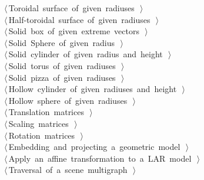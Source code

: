 \documentclass[11pt,oneside]{article}	%
\begin{document}
\begin{flushleft}
\begin{list}{}{}
\mbox{}\verb@@\hbox{$\langle\,$Toroidal surface of given radiuses\nobreak\ {\footnotesize {}}$\,\rangle$}\verb@@\\
\mbox{}\verb@@\hbox{$\langle\,$Half-toroidal surface of given radiuses\nobreak\ {\footnotesize {}}$\,\rangle$}\verb@@\\
\mbox{}\verb@@\hbox{$\langle\,$Solid box of given extreme vectors\nobreak\ {\footnotesize {}}$\,\rangle$}\verb@@\\
\mbox{}\verb@@\hbox{$\langle\,$Solid Sphere of given radius\nobreak\ {\footnotesize {}}$\,\rangle$}\verb@@\\
\mbox{}\verb@@\hbox{$\langle\,$Solid cylinder of given radius and height\nobreak\ {\footnotesize {}}$\,\rangle$}\verb@@\\
\mbox{}\verb@@\hbox{$\langle\,$Solid torus of given radiuses\nobreak\ {\footnotesize {}}$\,\rangle$}\verb@@\\
\mbox{}\verb@@\hbox{$\langle\,$Solid pizza of given radiuses\nobreak\ {\footnotesize {}}$\,\rangle$}\verb@@\\
\mbox{}\verb@@\hbox{$\langle\,$Hollow cylinder of given radiuses and height\nobreak\ {\footnotesize {}}$\,\rangle$}\verb@@\\
\mbox{}\verb@@\hbox{$\langle\,$Hollow sphere of given radiuses\nobreak\ {\footnotesize {}}$\,\rangle$}\verb@@\\
\mbox{}\verb@@\hbox{$\langle\,$Translation matrices\nobreak\ {\footnotesize {}}$\,\rangle$}\verb@@\\
\mbox{}\verb@@\hbox{$\langle\,$Scaling matrices\nobreak\ {\footnotesize {}}$\,\rangle$}\verb@@\\
\mbox{}\verb@@\hbox{$\langle\,$Rotation matrices\nobreak\ {\footnotesize {}}$\,\rangle$}\verb@@\\
\mbox{}\verb@@\hbox{$\langle\,$Embedding and projecting a geometric model\nobreak\ {\footnotesize {}}$\,\rangle$}\verb@@\\
\mbox{}\verb@@\hbox{$\langle\,$Apply an affine transformation to a LAR model\nobreak\ {\footnotesize {}}$\,\rangle$}\verb@@\\
\mbox{}\verb@@\hbox{$\langle\,$Traversal of a scene multigraph\nobreak\ {\footnotesize {}}$\,\rangle$}\verb@@\\
\mbox{}\verb@@{\NWsep}
\end{list}
\vspace{-2ex}
\end{flushleft}
\end{document}
